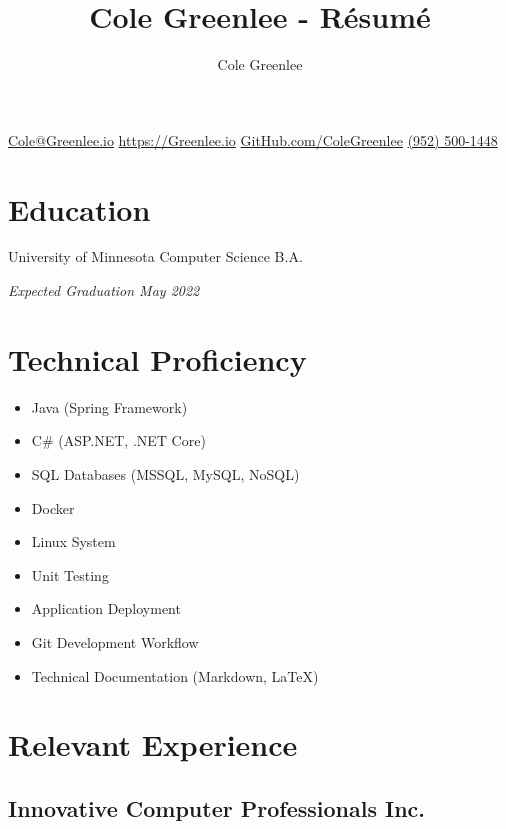\documentclass{article}
\title{Cole Greenlee - R\'esum\'e}
\author{Cole Greenlee}
\makeatletter
\renewcommand{\maketitle}{
\begin{center}
{\huge\bfseries\theauthor}
\end{center}
\begin{center}
\begin{multicols}{4}
\href{mailto:Cole@Greenlee.io}{Cole@Greenlee.io}
\href{https://Greenlee.io}{https://Greenlee.io}
\href{https://GitHub.com/ColeGreenlee/}{GitHub.com/ColeGreenlee}
\href{tel:+19525001448}{(952) 500-1448}
\end{multicols}
\end{center}
}
\makeatother
\begin{document}
\selectfont
\maketitle
\section{Education}
\vspace{-1.5em}
\begin{multicols}{2}
\begin{flushleft}
University of Minnesota Computer Science B.A.
\end{flushleft}
\begin{flushright}
\textit{Expected Graduation May 2022}
\end{flushright}
\end{multicols}

\section{Technical Proficiency}
\vspace{-1.5em}
\begin{multicols}{2}
\begin{itemize}[leftmargin=*]
	\item Java (Spring Framework)
	\item C\# (ASP.NET, .NET Core)
	\item SQL Databases (MSSQL, MySQL, NoSQL)
	\item Docker
	\item Linux System
	\item Unit Testing
	\item Application Deployment
	\item Git Development Workflow
	\item Technical Documentation (Markdown, LaTeX)
\end{itemize}
\end{multicols}

\section{Relevant Experience}
\subsection{Innovative Computer Professionals Inc.}
\end{document}
